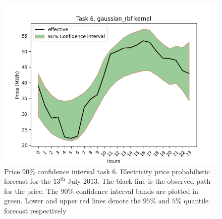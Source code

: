 \begin{figure}[!ht]
    \centering
    \includegraphics[width=\linewidth]{images/price_task_6_gaussian_rbf.png}
    \caption[Prediction price track task 6, Gaussian RBF kernel]{Price 90\% confidence interval task 6. Electricity price probabilistic forecast for the $13^{\text{th}}$ July $2013$. The black line is the observed path for the price. The $90\%$ confidence interval bands are plotted in green. Lower and upper red lines denote the $95\%$ and $5\%$ quantile forecast respectively}
    \label{fig:price_task_6_gaussian_rbf}
\end{figure}




